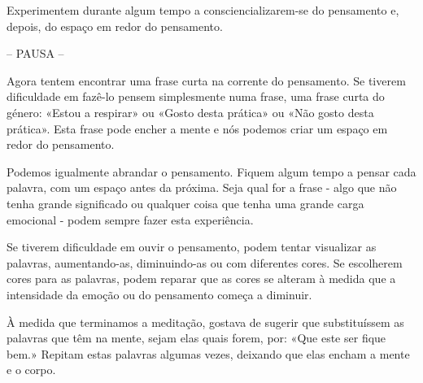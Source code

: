 Experimentem durante algum tempo a consciencializarem-se do pensamento
e, depois, do espaço em redor do pensamento.

\bigskip

{\centering
-- PAUSA --\par}

\bigskip

Agora tentem encontrar uma frase curta na corrente do pensamento. Se
tiverem dificuldade em fazê-lo pensem simplesmente numa frase, uma frase
curta do género: «Estou a respirar» ou «Gosto desta prática» ou «Não
gosto desta prática». Esta frase pode encher a mente e nós podemos criar
um espaço em redor do pensamento.

Podemos igualmente abrandar o pensamento. Fiquem algum tempo a pensar
cada palavra, com um espaço antes da próxima. Seja qual for a frase -
algo que não tenha grande significado ou qualquer coisa que tenha uma
grande carga emocional - podem sempre fazer esta experiência.

Se tiverem dificuldade em ouvir o pensamento, podem tentar visualizar as
palavras, aumentando-as, diminuindo-as ou com diferentes cores. Se
escolherem cores para as palavras, podem reparar que as cores se alteram
à medida que a intensidade da emoção ou do pensamento começa a diminuir.

À medida que terminamos a meditação, gostava de sugerir que
substituíssem as palavras que têm na mente, sejam elas quais forem, por:
«Que este ser fique bem.» Repitam estas palavras algumas vezes, deixando
que elas encham a mente e o corpo.
